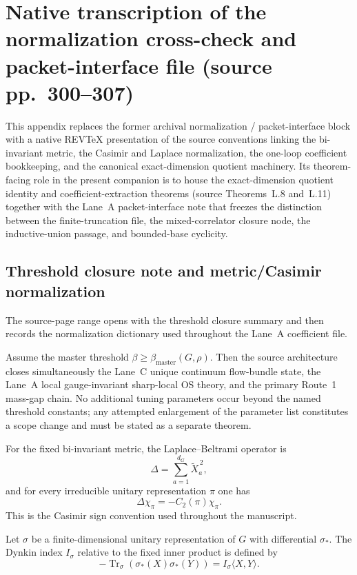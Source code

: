 \section{Native transcription of the normalization cross-check and packet-interface file (source pp.~300--307)}
This appendix replaces the former archival normalization / packet-interface block with a native REV\TeX{} presentation of the source conventions linking the bi-invariant metric, the Casimir and Laplace normalization, the one-loop coefficient bookkeeping, and the canonical exact-dimension quotient machinery. Its theorem-facing role in the present companion is to house the exact-dimension quotient identity and coefficient-extraction theorems (source Theorems~L.8 and~L.11) together with the Lane~A packet-interface note that freezes the distinction between the finite-truncation file, the mixed-correlator closure node, the inductive-union passage, and bounded-base cyclicity.

\subsection{Threshold closure note and metric/Casimir normalization}
The source-page range opens with the threshold closure summary and then records the normalization dictionary used throughout the Lane~A coefficient file.

\begin{remark}
Assume the master threshold $\beta\ge \beta_{\mathrm{master}}(G,\rho)$. Then the source architecture closes simultaneously the Lane~C unique continuum flow-bundle state, the Lane~A local gauge-invariant sharp-local OS theory, and the primary Route~1 mass-gap chain. No additional tuning parameters occur beyond the named threshold constants; any attempted enlargement of the parameter list constitutes a scope change and must be stated as a separate theorem.
\end{remark}

\begin{lemma}
For the fixed bi-invariant metric, the Laplace--Beltrami operator is
\[
\Delta = \sum_{a=1}^{d_G}\widetilde X_a^{\,2},
\]
and for every irreducible unitary representation $\pi$ one has
\[
\Delta\chi_\pi = -C_2(\pi)\chi_\pi.
\]
This is the Casimir sign convention used throughout the manuscript.
\end{lemma}

\begin{definition}
Let $\sigma$ be a finite-dimensional unitary representation of $G$ with differential $\sigma_\ast$. The Dynkin index $I_\sigma$ relative to the fixed inner product is defined by
\[
-\operatorname{Tr}_\sigma(\sigma_\ast(X)\sigma_\ast(Y)) = I_\sigma\langle X,Y\rangle.
\]
\end{definition}

